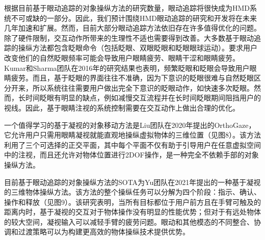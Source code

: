 根据目前基于眼动追踪的对象操纵方法的研究数量，眼动追踪将很快成为HMD系统不可或缺的一部分。因此，我们预计围绕HMD眼动追踪的研究和开发将在未来几年加速和扩展。然而，目前大部分眼动追踪方法依旧存在许多值得优化的问题。除了硬件限制，交互动作所带来的生理性不适也需要得到改善。大多数基于眼动追踪的操纵方法都包含眨眼命令（包括眨眼、双眼眨眼和眨眼眼球运动）。要求用户改变他们的自然眨眼频率可能会导致用户眼睛疲劳、眼睛干涩和眼睛疲劳。Kumar和Sharma团队在2016年的研究结果也表明，频繁眨眼和眨眼会导致用户眼睛疲劳。而且，基于眨眼的界面往往不准确，因为下意识的眨眼很难与自然眨眼区分开来，所以系统往往需要用户做出完全下意识的眨眼动作，如快速多次眨眼。然而，长时间眨眼有明显的缺点，例如减慢交互流程并在长时间眨眼期间阻挡用户的视线。因此，基于眼睛注视的系统控制需要在交互动作上做出合理的优化。

一个值得学习的基于凝视的对象移动方法是Liu团队在2020年提出的OrthoGaze，它允许用户只需用眼睛凝视就能直观地操纵虚拟物体的三维位置（见图8）。该方法利用了三个可选择的正交平面，其中每个平面不仅有助于引导用户在任意虚拟空间中的注视，而且还允许对物体位置进行2DOF操作，是一种完全不依赖手部的对象操纵方法。

目前基于眼动追踪的对象操纵方法的SOTA为Yu团队在2021年提出的一种基于凝视的三维物体操纵方法。该方法的整个操纵任务可以分解为四个阶段：指示、确认、操作和释放（见图9）。该研究表明，当所有目标都位于用户前方且在手臂可触及的距离内时，基于凝视的交互对于物体操作没有明显的性能优势；但对于有远处物体的较大空间，凝视输入可以减轻手臂的疲劳问题。眼动和其他模态的不同整合、协调和过渡策略可以为构建更高效的物体操纵技术提供优势。
